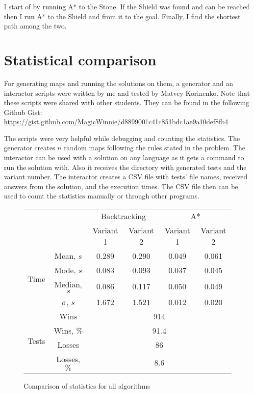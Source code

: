 \documentclass{article}
\begin{document}
I start of by running A* to the Stone. If the Shield was found and can be reached then I run A* to the Shield and from it to the goal.
Finally, I find the shortest path among the two.

\section{Statistical comparison}
For generating maps and running the solutions on them, a generator and an interactor scripts were written by me and tested by Matvey Korinenko. Note that these scripts were shared with other students. They can be found in the following Github Gist: \url{https://gist.github.com/MagicWinnie/d8899001c41c851bdc1ae9a10def8fb4}

The scripts were very helpful while debugging and counting the statistics.
The generator creates $n$ random maps following the rules stated in the problem.
The interactor can be used with a solution on any language as it gets a command to run the solution with. Also it receives the directory with generated tests and the variant number. The interactor creates a CSV file with tests' file names, received answers from the solution, and the execution times.
The CSV file then can be used to count the statistics manually or through other programs.

\begin{figure}[H]
    \centering
    \begin{tabular}{c|c|c|c|c|c}
        \multicolumn{2}{c}{} & \multicolumn{2}{|c}{Backtracking} & \multicolumn{2}{|c}{A*} \\
        \cline{3-6}
        \multicolumn{2}{c|}{} & Variant 1 & Variant 2 & Variant 1 & Variant 2 \\
        \hline
        \hline
        \multirow{4}{*}{Time} & Mean, $s$ & 0.289 & 0.290 & 0.049 & 0.061 \\
        \cline{2-6}
        & Mode, $s$ & 0.083 & 0.093 & 0.037 & 0.045 \\
        \cline{2-6}
        & Median, $s$ & 0.086 & 0.117 & 0.050 & 0.049 \\
        \cline{2-6}
        & $\sigma$, $s$ & 1.672 & 1.521 & 0.012 & 0.020 \\
        \hline
        \multirow{4}{*}{Tests} & Wins & \multicolumn{4}{c}{914} \\
        \cline{2-6}
        & Wins, $\%$ & \multicolumn{4}{c}{91.4} \\
        \cline{2-6}
        & Losses & \multicolumn{4}{c}{86} \\
        \cline{2-6}
        & Losses, $\%$ & \multicolumn{4}{c}{8.6} \\
    \end{tabular}
    \caption{Comparison of statistics for all algorithms}
    \label{fig:statistics}
\end{figure}
\end{document}
